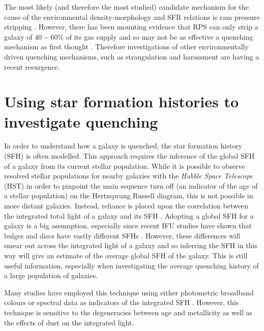 The most likely (and therefore the most studied) candidate mechanism for the cause of the environmental density-morphology and SFR relations is ram pressure stripping \citep[RPS;][]{abadi99, poggianti99}. However, there has been mounting evidence that RPS can only strip a galaxy of $40-60\%$ of its gas supply \citep{fillingham16} and so may not be as effective a quenching mechanism as first thought \citep{emerick16}. Therefore investigations of other environmentally driven quenching mechanisms, such as strangulation \citep{peng15, hahn16, maier16, paccagnella16, roberts16, vandevoort16} and harassment \citep[high speed galaxy `fly-by' gravitational interactions][]{bialas15, smith15b} are having a recent resurgence. 

\section{Using star formation histories to investigate quenching}\label{sec:invquench}


In order to understand how a galaxy is quenched, the star formation history (SFH) is often modelled. This approach requires the inference of the global SFH of a galaxy from its current stellar population. While it is possible to observe resolved stellar populations for nearby galaxies with the \emph{Hubble Space Telescope} (HST) in order to pinpoint the main sequence turn off (an indicator of the age of a stellar population) on the Hertzsprung Russell diagram, this is not possible in more distant galaxies. Instead, reliance is placed upon the correlation between the integrated total light of a galaxy and its SFH \citep{searle73}. Adopting a global SFH for a galaxy is a big assumption, especially since recent IFU studies have shown that bulges and discs have vastly different SFHs \citep[see for example][]{johnston16}. However, these differences will smear out across the integrated light of a galaxy and so inferring the SFH in this way will give an estimate of the average global SFH of the galaxy. This is still useful information, especially when investigating the average quenching history of a large population of galaxies.

Many studies have employed this technique using either photometric broadband colours or spectral data as indicators of the integrated SFH \citep[for example][]{deJong96, madau98, davies01, kauffmann03, dressler04, macarthur04, Martin07, perez11, sanchez11, mcdermid15}. However, this technique is sensitive to the degeneracies between age and metallicity \citep{worthey94} as well as the effects of dust \citep{ganda09, pastrav13} on the integrated light. 

